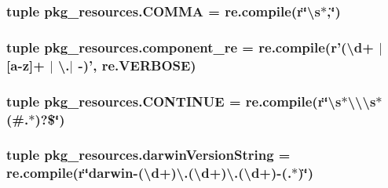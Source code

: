 \subsubsection[{C\+O\+M\+M\+A}]{\setlength{\rightskip}{0pt plus 5cm}tuple pkg\+\_\+resources.\+C\+O\+M\+M\+A = re.\+compile({\bf r}\char`\"{}\textbackslash{}s$\ast$,\char`\"{})}\label{namespacepkg__resources_aaa98f1116821e21c7cc32afb9071abb5}
\hypertarget{namespacepkg__resources_a8ea25986750b23a826922f840a1f11f3}{}
\subsubsection[{component\+\_\+re}]{\setlength{\rightskip}{0pt plus 5cm}tuple pkg\+\_\+resources.\+component\+\_\+re = re.\+compile({\bf r}'(\textbackslash{}d+ $\vert$ \mbox{[}{\bf a}-\/z\mbox{]}+ $\vert$ \textbackslash{}.$\vert$ -\/)', re.\+V\+E\+R\+B\+O\+S\+E)}\label{namespacepkg__resources_a8ea25986750b23a826922f840a1f11f3}
\hypertarget{namespacepkg__resources_ae001575ac77e85aa6f9e5434d1cdb7a3}{}
\subsubsection[{C\+O\+N\+T\+I\+N\+U\+E}]{\setlength{\rightskip}{0pt plus 5cm}tuple pkg\+\_\+resources.\+C\+O\+N\+T\+I\+N\+U\+E = re.\+compile({\bf r}\char`\"{}\textbackslash{}s$\ast$\textbackslash{}\textbackslash{}\textbackslash{}{\bf s}$\ast$(\#.$\ast$)?\$\char`\"{})}\label{namespacepkg__resources_ae001575ac77e85aa6f9e5434d1cdb7a3}
\hypertarget{namespacepkg__resources_a6404062b96457d0de8553d4fb6654557}{}
\subsubsection[{darwin\+Version\+String}]{\setlength{\rightskip}{0pt plus 5cm}tuple pkg\+\_\+resources.\+darwin\+Version\+String = re.\+compile({\bf r}\char`\"{}darwin-\/(\textbackslash{}d+)\textbackslash{}.(\textbackslash{}d+)\textbackslash{}.(\textbackslash{}d+)-\/(.$\ast$)\char`\"{})}\label{namespacepkg__resources_a6404062b96457d0de8553d4fb6654557}
\hypertarget{namespacepkg__resources_a3831b5c990f62e01f97b3a4f33a75a83}{}
